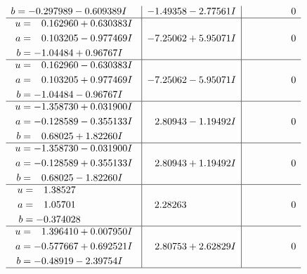 \documentclass[1p]{elsarticle_modified}
\theoremstyle{definition}
\begin{document}
$$\begin{array}{c|c|c}
\begin{aligned}
b &= -0.297989 - 0.609389 I\end{aligned}
 & -1.49358 - 2.77561 I & \phantom{-0.000000 } 0 \\ \hline\begin{aligned}
u &= \phantom{-}0.162960 + 0.630383 I \\
a &= \phantom{-}0.103205 - 0.977469 I \\
b &= -1.04484 + 0.96767 I\end{aligned}
 & -7.25062 + 5.95071 I & \phantom{-0.000000 } 0 \\ \hline\begin{aligned}
u &= \phantom{-}0.162960 - 0.630383 I \\
a &= \phantom{-}0.103205 + 0.977469 I \\
b &= -1.04484 - 0.96767 I\end{aligned}
 & -7.25062 - 5.95071 I & \phantom{-0.000000 } 0 \\ \hline\begin{aligned}
u &= -1.358730 + 0.031900 I \\
a &= -0.128589 - 0.355133 I \\
b &= \phantom{-}0.68025 + 1.82260 I\end{aligned}
 & \phantom{-}2.80943 - 1.19492 I & \phantom{-0.000000 } 0 \\ \hline\begin{aligned}
u &= -1.358730 - 0.031900 I \\
a &= -0.128589 + 0.355133 I \\
b &= \phantom{-}0.68025 - 1.82260 I\end{aligned}
 & \phantom{-}2.80943 + 1.19492 I & \phantom{-0.000000 } 0 \\ \hline\begin{aligned}
u &= \phantom{-}1.38527\phantom{ +0.000000I} \\
a &= \phantom{-}1.05701\phantom{ +0.000000I} \\
b &= -0.374028\phantom{ +0.000000I}\end{aligned}
 & \phantom{-}2.28263\phantom{ +0.000000I} & \phantom{-0.000000 } 0 \\ \hline\begin{aligned}
u &= \phantom{-}1.396410 + 0.007950 I \\
a &= -0.577667 + 0.692521 I \\
b &= -0.48919 - 2.39754 I\end{aligned}
 & \phantom{-}2.80753 + 2.62829 I & \phantom{-0.000000 } 0\\
 \hline 
 \end{array}$$\newpage$$\begin{array}{c|c|c}  

\end{array}$$
\end{document}
